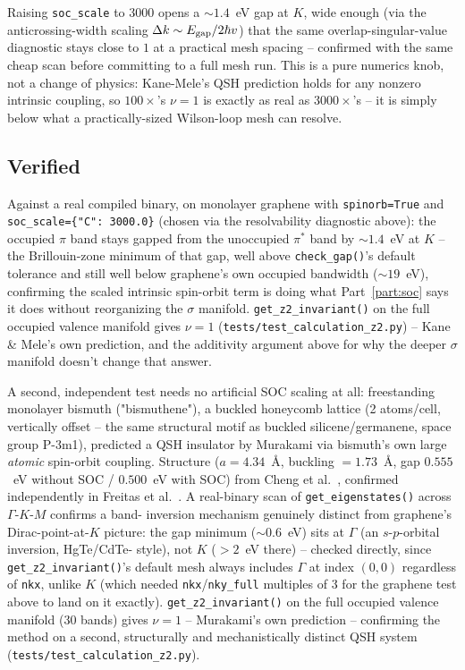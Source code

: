 \documentclass[11pt]{article}
\begin{document}
Raising \texttt{soc\_scale} to $3000$ opens a $\sim1.4$~eV gap at $K$, wide enough (via
the anticrossing-width scaling $\Delta k\sim E_{\rm gap}/2\hbar v$) that the same
overlap-singular-value diagnostic stays close to $1$ at a practical mesh spacing --
confirmed with the same cheap scan before committing to a full mesh run. This is a pure
numerics knob, not a change of physics: Kane-Mele's QSH prediction holds for any nonzero
intrinsic coupling, so $100\times$'s $\nu=1$ is exactly as real as $3000\times$'s -- it
is simply below what a practically-sized Wilson-loop mesh can resolve.

\subsection{Verified}

Against a real compiled binary, on monolayer graphene with \texttt{spinorb=True} and
\texttt{soc\_scale=\{"C": 3000.0\}} (chosen via the resolvability diagnostic above): the
occupied $\pi$ band stays gapped from the unoccupied $\pi^*$ band by $\sim1.4$~eV at
$K$ -- the Brillouin-zone minimum of that gap, well above \texttt{check\_gap()}'s
default tolerance and still well below graphene's own occupied bandwidth ($\sim19$~eV),
confirming the scaled intrinsic spin-orbit term is doing what Part~\ref{part:soc} says
it does without reorganizing the $\sigma$ manifold. \texttt{get\_z2\_invariant()} on the
full occupied valence manifold gives $\nu=1$ (\texttt{tests/test\_calculation\_z2.py})
-- Kane \& Mele's own prediction, and the additivity argument above for why the deeper
$\sigma$ manifold doesn't change that answer.

A second, independent test needs no artificial SOC scaling at all: freestanding
monolayer bismuth ("bismuthene"), a buckled honeycomb lattice (2 atoms/cell, vertically
offset -- the same structural motif as buckled silicene/germanene, space group P-3m1),
predicted a QSH insulator by Murakami \cite{murakami2006} via bismuth's own large
\emph{atomic} spin-orbit coupling. Structure ($a=4.34$~\AA, buckling $=1.73$~\AA, gap
$0.555$~eV without SOC / $0.500$~eV with SOC) from Cheng et al.\ \cite{cheng2014},
confirmed independently in Freitas et al.\ \cite{freitas2015}. A
real-binary scan of \texttt{get\_eigenstates()} across $\Gamma$-$K$-$M$ confirms a band-
inversion mechanism genuinely distinct from graphene's Dirac-point-at-$K$ picture: the
gap minimum ($\sim0.6$~eV) sits at $\Gamma$ (an $s$-$p$-orbital inversion, HgTe/CdTe-
style), not $K$ ($>2$~eV there) -- checked directly, since \texttt{get\_z2\_invariant()}'s
default mesh always includes $\Gamma$ at index $(0,0)$ regardless of \texttt{nkx},
unlike $K$ (which needed \texttt{nkx}/\texttt{nky\_full} multiples of 3 for the graphene
test above to land on it exactly). \texttt{get\_z2\_invariant()} on the full occupied
valence manifold (30 bands) gives $\nu=1$ -- Murakami's own prediction -- confirming the
method on a second, structurally and mechanistically distinct QSH system
(\texttt{tests/test\_calculation\_z2.py}).
\end{document}
